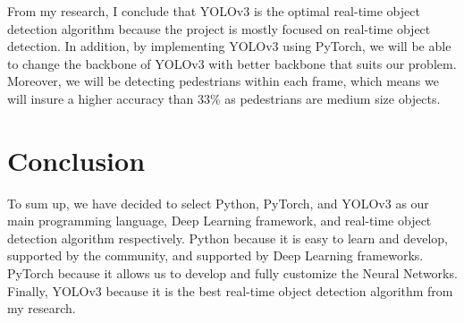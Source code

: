 \documentclass[onecolumn, draftclsnofoot,10pt, compsoc]{IEEEtran}
\begin{document}
From my research, I conclude that YOLOv3 is the optimal real-time object detection algorithm because the project is mostly focused on real-time object detection. In addition, by implementing YOLOv3 using PyTorch, we will be able to change the backbone of YOLOv3 with better backbone that suits our problem. Moreover, we will be detecting pedestrians within each frame, which means we will insure a higher accuracy than 33\% as pedestrians are medium size objects. 




\section{Conclusion}
To sum up, we have decided to select Python, PyTorch, and YOLOv3 as our main programming language, Deep Learning framework, and real-time object detection algorithm respectively. Python because it is easy to learn and develop, supported by the community, and supported by Deep Learning frameworks. PyTorch because it allows us to develop and fully customize the Neural Networks. Finally, YOLOv3 because it is the best real-time object detection algorithm from my research. 
\end{document}
